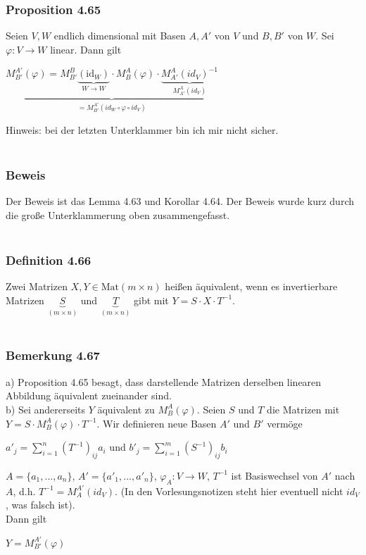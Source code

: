 \documentclass{article}
\DeclareMathOperator*{\sumop}{\sum}
\begin{document}
\subsubsection*{Proposition 4.65}
Seien $V, W$ endlich dimensional mit Basen $A, A'$ von $V$ und $B, B'$ von $W$. Sei $\varphi: V \rightarrow W$ linear. Dann gilt \\
\begin{center}
    $\underbrace{M_{B'}^{A'}(\varphi) = M_{B'}^{B}\underbrace{(\text{id}_W)}_{W \rightarrow W} \cdot M_{B}^{A}(\varphi) \cdot \underbrace{M_{A'}^{A}(id_V)^{-1}}_{M_{A'}^{A}(id_V)}}_{=M_{B'}^{A'}(id_W \circ \varphi \circ id_V)}$ \\
\end{center}
Hinweis: bei der letzten Unterklammer bin ich mir nicht sicher. \\
\\
\subsubsection*{Beweis}
Der Beweis ist das Lemma 4.63 und Korollar 4.64. Der Beweis wurde kurz durch die große Unterklammerung oben zusammengefasst. \\
\\
\subsubsection*{Definition 4.66}
Zwei Matrizen $X,Y \in \text{Mat}(m \times n)$ heißen äquivalent, wenn es invertierbare Matrizen $\underbrace{S}_{(m \times n)}$ und $\underbrace{T}_{(m \times n)}$ gibt mit $Y=S \cdot X \cdot T^{-1}$. \\
\\
\subsubsection*{Bemerkung 4.67}
a) Proposition 4.65 besagt, dass darstellende Matrizen derselben linearen Abbildung äquivalent zueinander sind. \\
b) Sei andererseits $Y$ äquivalent zu $M_B^{A}(\varphi)$. Seien $S$ und $T$ die Matrizen mit $Y=S \cdot M_B^{A}(\varphi) \cdot T^{-1}$. 
Wir definieren neue Basen $A'$ und $B'$ vermöge \\
\begin{center}
    $a'_j = \sumop_{i=1}^{n}(T^{-1})_{ij} a_i$ und $b'_j = \sumop_{i=1}^{m}(S^{-1})_{ij} b_i$ \\
\end{center}
$A = \{a_1,...,a_n\}$, $A' = \{a'_1,...,a'_n\}$, $\varphi_A: V \rightarrow W$, $T^{-1}$ ist Basiswechsel von $A'$ nach $A$, d.h. $T^{-1} = M_{A}^{A'}(id_V)$. (In den Vorlesungsnotizen steht hier eventuell nicht $id_V$, was falsch ist). \\
Dann gilt \\
\begin{center}
    $Y = M_{B'}^{A'}(\varphi)$ \\
\end{center}
\end{document}
